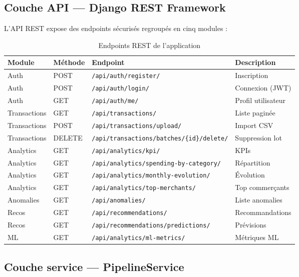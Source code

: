 \documentclass[12pt,a4paper]{report}
\begin{document}
\subsection{Couche API — Django REST Framework}

L'API REST expose des endpoints sécurisés regroupés en cinq modules :

\begin{table}[H]
  \centering
  \caption{Endpoints REST de l'application}
  \label{tab:endpoints}
  \renewcommand{\arraystretch}{1.3}
  \begin{tabularx}{\textwidth}{lllX}
    \toprule
    Module & Méthode & Endpoint & Description \\
    \midrule
    Auth & POST & \texttt{/api/auth/register/} & Inscription \\
    Auth & POST & \texttt{/api/auth/login/} & Connexion (JWT) \\
    Auth & GET & \texttt{/api/auth/me/} & Profil utilisateur \\
    Transactions & GET & \texttt{/api/transactions/} & Liste paginée \\
    Transactions & POST & \texttt{/api/transactions/upload/} & Import CSV \\
    Transactions & DELETE & \texttt{/api/transactions/batches/\{id\}/delete/} & Suppression lot \\
    Analytics & GET & \texttt{/api/analytics/kpi/} & KPIs \\
    Analytics & GET & \texttt{/api/analytics/spending-by-category/} & Répartition \\
    Analytics & GET & \texttt{/api/analytics/monthly-evolution/} & Évolution \\
    Analytics & GET & \texttt{/api/analytics/top-merchants/} & Top commerçants \\
    Anomalies & GET & \texttt{/api/anomalies/} & Liste anomalies \\
    Recos & GET & \texttt{/api/recommendations/} & Recommandations \\
    Recos & GET & \texttt{/api/recommendations/predictions/} & Prévisions \\
    ML & GET & \texttt{/api/analytics/ml-metrics/} & Métriques ML \\
    \bottomrule
  \end{tabularx}
\end{table}

\subsection{Couche service — PipelineService}
\end{document}
